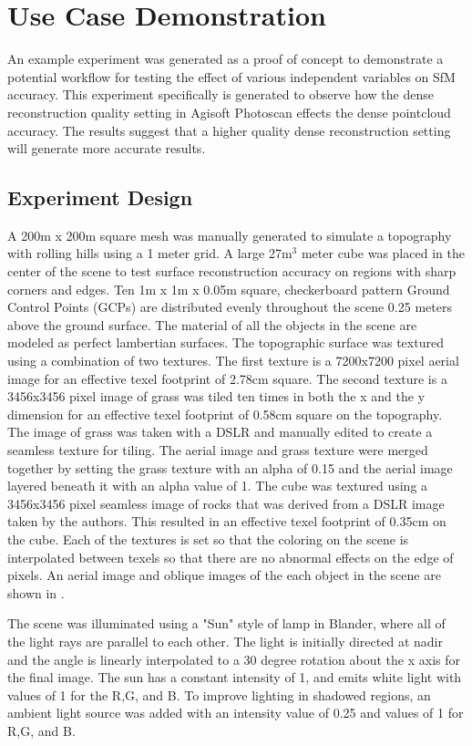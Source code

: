 \section{Use Case Demonstration}

An example experiment was generated as a proof of concept to demonstrate a potential workflow for testing the effect of various independent variables on SfM accuracy.  This experiment specifically is generated to observe how the dense reconstruction quality setting in Agisoft Photoscan effects the dense pointcloud accuracy.  The results suggest that a higher quality dense reconstruction setting will generate more accurate results.

\subsection{Experiment Design}
A 200m x 200m square mesh was manually generated to simulate a topography with rolling hills using a 1 meter grid.  A large 27m$^3$ meter cube was placed in the center of the scene to test surface reconstruction accuracy on regions with sharp corners and edges.  Ten 1m x 1m x 0.05m square, checkerboard pattern Ground Control Points (GCPs) are distributed evenly throughout the scene 0.25 meters above the ground surface.  The material of all the objects in the scene are modeled as perfect lambertian surfaces.  The topographic surface was textured using a combination of two textures.  The first texture is a 7200x7200 pixel aerial image  for an effective texel footprint of 2.78cm square.  The second texture is a 3456x3456 pixel image of grass was tiled ten times in both the x and the y dimension for an effective texel footprint of 0.58cm square on the topography.  The image of grass was taken with a DSLR and manually edited to create a seamless texture for tiling.  The aerial image and grass texture were merged together by setting the grass texture with an alpha of 0.15 and the aerial image layered beneath it with an alpha value of 1.  The cube was textured using a 3456x3456 pixel seamless image of rocks that was derived from a DSLR image taken by the authors.  This resulted in an effective texel footprint of 0.35cm on the cube.  Each of the textures is set so that the coloring on the scene is interpolated between texels so that there are no abnormal effects on the edge of pixels.  An aerial image and oblique images of the each object in the scene are shown in . 

The scene was illuminated using a "Sun" style of lamp in Blander, where all of the light rays are parallel to each other.  The light is initially directed at nadir and the angle is linearly interpolated to a 30 degree rotation about the x axis for the final image. The sun has a constant intensity of 1, and emits white light with values of 1 for the R,G, and B.  To improve lighting in shadowed regions, an ambient light source was added with an intensity value of 0.25 and values of 1 for R,G, and B.  

